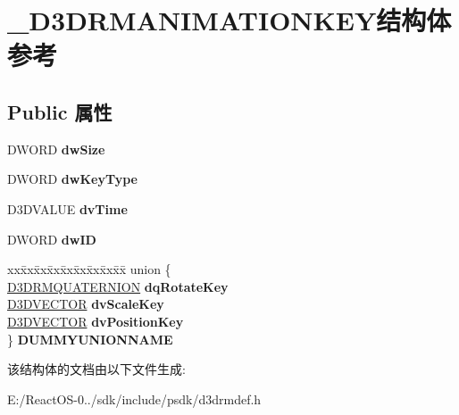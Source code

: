\hypertarget{struct___d3_d_r_m_a_n_i_m_a_t_i_o_n_k_e_y}{}\section{\+\_\+\+D3\+D\+R\+M\+A\+N\+I\+M\+A\+T\+I\+O\+N\+K\+E\+Y结构体 参考}
\label{struct___d3_d_r_m_a_n_i_m_a_t_i_o_n_k_e_y}
\subsection*{Public 属性}
\begin{DoxyCompactItemize}
\item 
\mbox{\label{struct___d3_d_r_m_a_n_i_m_a_t_i_o_n_k_e_y_a936435f68cf3ba7ecae0351d41904c53}} 
D\+W\+O\+RD {\bfseries dw\+Size}
\item 
\mbox{\label{struct___d3_d_r_m_a_n_i_m_a_t_i_o_n_k_e_y_a636cd52be7c8758d80d249711a5e2f98}} 
D\+W\+O\+RD {\bfseries dw\+Key\+Type}
\item 
\mbox{\label{struct___d3_d_r_m_a_n_i_m_a_t_i_o_n_k_e_y_af8360db8ee3623eb4c7c29f0bb28eaec}} 
D3\+D\+V\+A\+L\+UE {\bfseries dv\+Time}
\item 
\mbox{\label{struct___d3_d_r_m_a_n_i_m_a_t_i_o_n_k_e_y_ad9827cb6220c2f8139d066d21c8375e5}} 
D\+W\+O\+RD {\bfseries dw\+ID}
\item 
\mbox{\label{struct___d3_d_r_m_a_n_i_m_a_t_i_o_n_k_e_y_a286399be3bbbc19971531ff839b0fcdd}} 
\begin{tabbing}
xx\=xx\=xx\=xx\=xx\=xx\=xx\=xx\=xx\=\kill
union \{\\
\>\hyperlink{struct___d3_d_r_m_q_u_a_t_e_r_n_i_o_n}{D3DRMQUATERNION} {\bfseries dqRotateKey}\\
\>\hyperlink{struct___d3_d_v_e_c_t_o_r}{D3DVECTOR} {\bfseries dvScaleKey}\\
\>\hyperlink{struct___d3_d_v_e_c_t_o_r}{D3DVECTOR} {\bfseries dvPositionKey}\\
\} {\bfseries DUMMYUNIONNAME}\\

\end{tabbing}\end{DoxyCompactItemize}


该结构体的文档由以下文件生成\+:\begin{DoxyCompactItemize}
\item 
E\+:/\+React\+O\+S-\/0../sdk/include/psdk/d3drmdef.\+h\end{DoxyCompactItemize}
